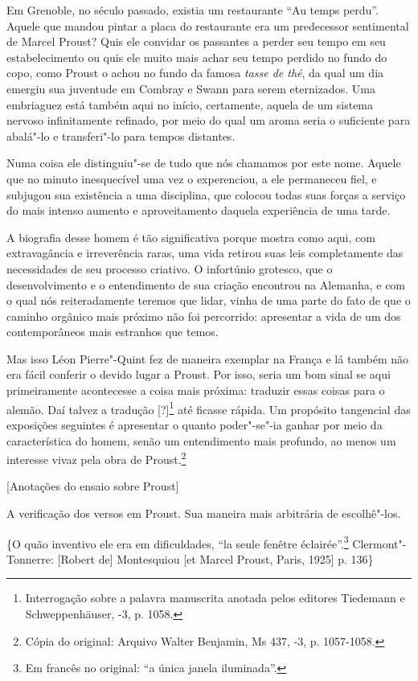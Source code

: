 Em Grenoble, no século passado, existia um restaurante ``Au temps
perdu''. Aquele que mandou pintar a placa do restaurante era um
predecessor sentimental de Marcel Proust? Quis ele convidar os passantes
a perder seu tempo em seu estabelecimento ou quis ele muito mais achar
seu tempo perdido no fundo do copo, como Proust o achou no fundo da
famosa \emph{tasse de thé}, da qual um dia emergiu sua juventude em
Combray e Swann para serem eternizados. Uma embriaguez está também aqui
no início, certamente, aquela de um sistema nervoso infinitamente
refinado, por meio do qual um aroma seria o suficiente para abalá"-lo e
transferi"-lo para tempos distantes.

Numa coisa ele distinguiu"-se de tudo que nós chamamos por este nome.
Aquele que no minuto inesquecível uma vez o experenciou, a ele
permaneceu fiel, e subjugou sua existência a uma disciplina, que colocou
todas suas forças a serviço do mais intenso aumento e aproveitamento
daquela experiência de uma tarde.

A biografia desse homem é tão significativa porque mostra como aqui, com
extravagância e irreverência raras, uma vida retirou suas leis
completamente das necessidades de seu processo criativo. O infortúnio
grotesco, que o desenvolvimento e o entendimento de
sua criação encontrou na Alemanha, e com o qual nós reiteradamente
teremos que lidar, vinha de uma parte do fato de que o caminho orgânico
mais próximo não foi percorrido: apresentar a vida de um dos
contemporâneos mais estranhos que temos.

Mas isso Léon Pierre"-Quint fez de maneira exemplar na França e lá também
não era fácil conferir o devido lugar a Proust. Por isso, seria um bom
sinal se aqui primeiramente acontecesse a coisa mais próxima: traduzir
essas coisas para o alemão. Daí talvez a tradução {[}?{]}\footnote{Interrogação sobre a palavra manuscrita anotada pelos editores
  Tiedemann e Schweppenhäuser, -3, p. 1058. \versal{[N. T.]}} até ficasse
rápida. Um propósito tangencial das exposições seguintes é apresentar o
quanto poder"-se"-ia ganhar por meio da característica do homem, senão um
entendimento mais profundo, ao menos um interesse vivaz pela obra de
Proust.\footnote{Cópia do original: Arquivo Walter Benjamin, Ms 437, -3, p. 1057-1058.}

{[}Anotações do ensaio sobre Proust{]}

A verificação dos versos em Proust. Sua maneira mais arbitrária de
escolhê"-los.

\{O quão inventivo ele era em dificuldades, ``la seule fenêtre
éclairée''.\footnote{Em francês no original: ``a única janela iluminada''. \versal{[N. T.]}}
Clermont"-Tonnerre: {[}Robert de{]} Montesquiou {[}et Marcel Proust,
Paris, 1925{]} p. 136\}


